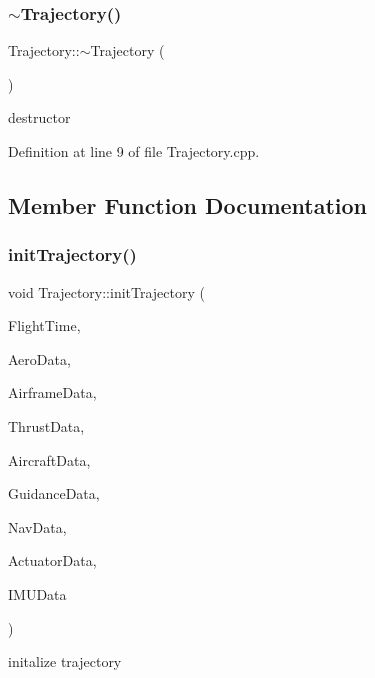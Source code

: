 \subsubsection{\texorpdfstring{$\sim$\+Trajectory()}{~Trajectory()}}
{\footnotesize\ttfamily Trajectory\+::$\sim$\+Trajectory (\begin{DoxyParamCaption}{ }\end{DoxyParamCaption})}



destructor 



Definition at line 9 of file Trajectory.\+cpp.



\subsection{Member Function Documentation}
\mbox{\label{class_trajectory_a1cfa48216ff480563708998e3b8dab5f}} 
\subsubsection{\texorpdfstring{init\+Trajectory()}{initTrajectory()}}
{\footnotesize\ttfamily void Trajectory\+::init\+Trajectory (\begin{DoxyParamCaption}\item[{\hyperlink{group___tools_ga3f1431cb9f76da10f59246d1d743dc2c}{Float64} \&}]{Flight\+Time,  }\item[{Aerodynamic\+Struct \&}]{Aero\+Data,  }\item[{Airframe\+Struct \&}]{Airframe\+Data,  }\item[{Thrust\+Struct \&}]{Thrust\+Data,  }\item[{Aircraft\+Struct \&}]{Aircraft\+Data,  }\item[{Guidance\+Struct \&}]{Guidance\+Data,  }\item[{Navigation\+Struct \&}]{Nav\+Data,  }\item[{Actuator\+Struct \&}]{Actuator\+Data,  }\item[{I\+M\+U\+Struct \&}]{I\+M\+U\+Data }\end{DoxyParamCaption})}



initalize trajectory 


